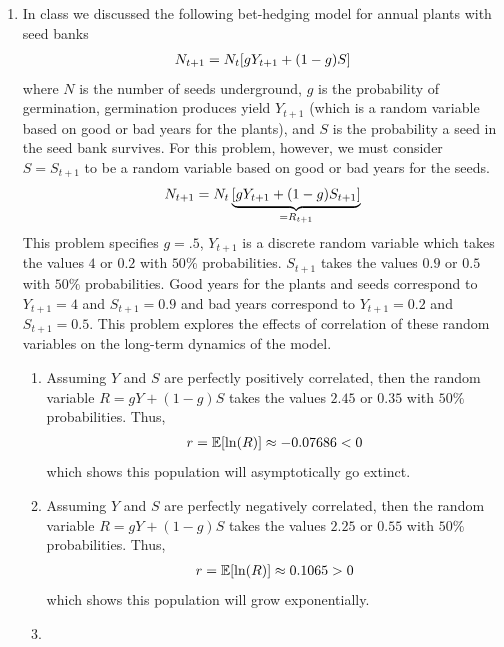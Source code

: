 \documentclass{article} %
\theoremstyle{plain}
\newcommand{\expec}[1]{\mathbb{E}\qty[#1]}
\numberwithin{equation}{section} %
\numberwithin{figure}{section} %
\numberwithin{table}{section} %
\begin{document}
\begin{enumerate}[\ \ (a)]
    \item
        In class we discussed the following bet-hedging model for annual plants with seed banks
        \begin{align*}
            N_{t+1} = N_t\qty[gY_{t+1} + (1-g)S]
        \end{align*}
        where $N$ is the number of seeds underground, $g$ is the probability of germination, germination produces yield $Y_{t+1}$ (which is a random variable based on good or bad years for the plants), and $S$ is the probability a seed in the seed bank survives.  For this problem, however, we must consider $S = S_{t+1}$ to be a random variable based on good or bad years for the seeds.
        \begin{align*}
            N_{t+1} = N_t\underbrace{\qty[gY_{t+1} + (1-g)S_{t+1}]}_{=R_{t+1}}
        \end{align*}
        This problem specifies $g = .5$, $Y_{t+1}$ is a discrete random variable which takes the values $4$ or $0.2$ with $50\%$ probabilities.  $S_{t+1}$ takes the values $0.9$ or $0.5$ with $50\%$ probabilities.  Good years for the plants and seeds correspond to $Y_{t+1} = 4$ and $S_{t+1} = 0.9$ and bad years correspond to $Y_{t+1} = 0.2$ and $S_{t+1} = 0.5$.  This problem explores the effects of correlation of these random variables on the long-term dynamics of the model.
        \begin{enumerate}[Pop.~A:\ ]
            \item
                Assuming $Y$ and $S$ are perfectly positively correlated, then the random variable $R = gY + (1-g)S$ takes the values $2.45$ or $0.35$ with $50\%$ probabilities.  Thus,
                \begin{align*}
                    r = \expec{\ln(R)} \approx -0.07686 < 0
                \end{align*}
                which shows this population will asymptotically go extinct.
            \item
                Assuming $Y$ and $S$ are perfectly negatively correlated, then the random variable $R = gY + (1-g)S$ takes the values $2.25$ or $0.55$ with $50\%$ probabilities.  Thus,
                \begin{align*}
                    r = \expec{\ln(R)} \approx 0.1065 > 0
                \end{align*}
                which shows this population will grow exponentially.
            \item

\end{enumerate}
\end{enumerate}
\end{document}
